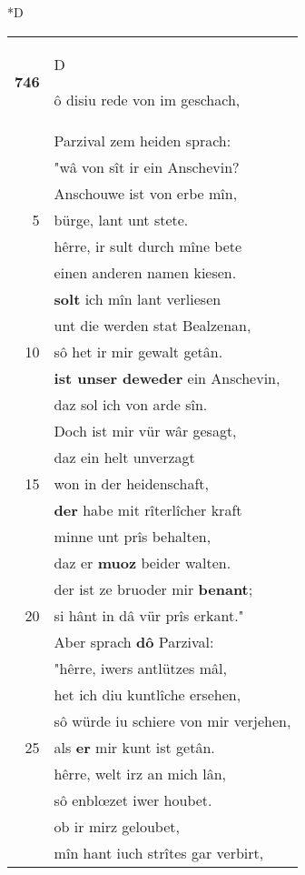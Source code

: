 \documentclass[8pt,a4paper,notitlepage]{article}
\begin{document}
\begin{table}[ht]
\begin{minipage}[t]{0.5\linewidth}
\small
\begin{center}*D
\end{center}
\begin{tabular}{rl}
\textbf{746} & \begin{large}D\end{large}ô disiu rede von im geschach,\\ 
 & Parzival zem heiden sprach:\\ 
 & "wâ von sît ir ein Anschevin?\\ 
 & Anschouwe ist von erbe mîn,\\ 
5 & bürge, lant unt stete.\\ 
 & hêrre, ir sult durch mîne bete\\ 
 & einen anderen namen kiesen.\\ 
 & \textbf{solt} ich mîn lant verliesen\\ 
 & unt die werden stat Bealzenan,\\ 
10 & sô het ir mir gewalt getân.\\ 
 & \textbf{ist unser deweder} ein Anschevin,\\ 
 & daz sol ich von arde sîn.\\ 
 & Doch ist mir vür wâr gesagt,\\ 
 & daz ein helt unverzagt\\ 
15 & won in der heidenschaft,\\ 
 & \textbf{der} habe mit rîterlîcher kraft\\ 
 & minne unt prîs behalten,\\ 
 & daz er \textbf{muoz} beider walten.\\ 
 & der ist ze bruoder mir \textbf{benant};\\ 
20 & si hânt in dâ vür prîs erkant."\\ 
 & Aber sprach \textbf{dô} Parzival:\\ 
 & "hêrre, iwers antlützes mâl,\\ 
 & het ich diu kuntlîche ersehen,\\ 
 & sô würde iu schiere von mir verjehen,\\ 
25 & als \textbf{er} mir kunt ist getân.\\ 
 & hêrre, welt irz an mich lân,\\ 
 & sô enblœzet iwer houbet.\\ 
 & ob ir mirz geloubet,\\ 
 & mîn hant iuch strîtes gar verbirt,\\ 

\end{tabular}
\end{minipage}
\end{table}
\end{document}
